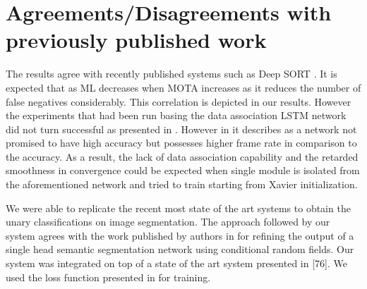 \section{Agreements/Disagreements with previously published work}

The results agree with recently published systems such as Deep SORT \cite{DeepSiam:deepSort}. It is expected that as ML decreases when MOTA increases as it reduces the number of false negatives considerably. This correlation is depicted in our results.
However the experiments that had been run basing the data association LSTM network did not turn successful as presented in \cite{DeepSiam:MilanL0RS16}. However in \cite{DeepSiam:MilanL0RS16} it describes as a network not promised to have high accuracy but possesses higher frame rate in comparison to the accuracy. As a result, the lack of data association capability and the retarded smoothness in convergence could be expected when single module is isolated from the aforementioned network and tried to train starting from Xavier initialization.

We were able to replicate the recent most state of the art systems to obtain the unary classifications on image segmentation. The approach followed by our system agrees with the work published by authors in \cite{Zhen_ICCV15_CRFRNN} for refining the output of a single head semantic segmentation network using conditional random fields. Our system was integrated on top of a state of the art system presented in [76]. We used the loss function presented in \cite{Anurag17} for training.  
